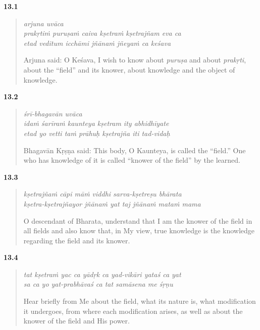 \par\noindent\textbf{13.1}\par
\begin{verse}
\textit{arjuna uvāca} \\
\textit{prakṛtiṁ puruṣaṁ caiva kṣetraṁ kṣetrajñam eva ca} \\
\textit{etad veditum icchāmi jñānaṁ jñeyaṁ ca keśava}

\noindent Arjuna said: O Keśava, I wish to know about \textit{puruṣa} and about \textit{prakṛti}, about the \enquote{field} and its knower, about knowledge and the object of knowledge.
\end{verse}
\par



\par\noindent\textbf{13.2}\par
\begin{verse}
\textit{śrī-bhagavān uvāca} \\
\textit{idaṁ śarīraṁ kaunteya kṣetram ity abhidhīyate} \\
\textit{etad yo vetti taṁ prāhuḥ kṣetrajña iti tad-vidaḥ}

\noindent Bhagavān Kṛṣṇa said: This body, O Kaunteya, is called the \enquote{field.} One who has knowledge of it is called \enquote{knower of the field} by the learned.
\end{verse}
\par



\par\noindent\textbf{13.3}\par
\begin{verse}
\textit{kṣetrajñaṁ cāpi māṁ viddhi sarva-kṣetreṣu bhārata} \\
\textit{kṣetra-kṣetrajñayor jñānaṁ yat taj jñānaṁ mataṁ mama}

\noindent O descendant of Bharata, understand that I am the knower of the field in all fields and also know that, in My view, true knowledge is the knowledge regarding the field and its knower.
\end{verse}
\par



\par\noindent\textbf{13.4}\par
\begin{verse}
\textit{tat kṣetraṁ yac ca yādṛk ca yad-vikāri yataś ca yat} \\
\textit{sa ca yo yat-prabhāvaś ca tat samāsena me śṛṇu}

\noindent Hear briefly from Me about the field, what its nature is, what modification it undergoes, from where each modification arises, as well as about the knower of the field and His power.
\end{verse}
\par


